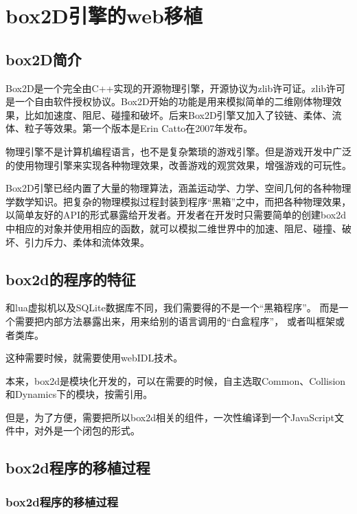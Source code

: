 \chapter{box2D引擎的web移植}

\section{box2D简介}

Box2D是一个完全由C++实现的开源物理引擎，开源协议为zlib许可证。zlib许可是一个自由软件授权协议。Box2D开始的功能是用来模拟简单的二维刚体物理效果，比如加速度、阻尼、碰撞和破坏。后来Box2D引擎又加入了铰链、柔体、流体、粒子等效果。第一个版本是Erin Catto在2007年发布。

物理引擎不是计算机编程语言，也不是复杂繁琐的游戏引擎。但是游戏开发中广泛的使用物理引擎来实现各种物理效果，改善游戏的观赏效果，增强游戏的可玩性。

Box2D引擎已经内置了大量的物理算法，涵盖运动学、力学、空间几何的各种物理学数学知识。把复杂的物理模拟过程封装到程序“黑箱”之中，而把各种物理效果，以简单友好的API的形式暴露给开发者。开发者在开发时只需要简单的创建box2d中相应的对象并使用相应的函数，就可以模拟二维世界中的加速、阻尼、碰撞、破坏、引力斥力、柔体和流体效果。

\section{box2d的程序的特征}

和lua虚拟机以及SQLite数据库不同，我们需要得的不是一个“黑箱程序”。
而是一个需要把内部方法暴露出来，用来给别的语言调用的“白盒程序”，
或者叫框架或者类库。

这种需要时候，就需要使用webIDL技术。

本来，box2d是模块化开发的，可以在需要的时候，自主选取Common、Collision和Dynamics下的模块，按需引用。

但是，为了方便，需要把所以box2d相关的组件，一次性编译到一个JavaScript文件中，对外是一个闭包的形式。

\section{box2d程序的移植过程}

\subsection{box2d程序的移植过程}

